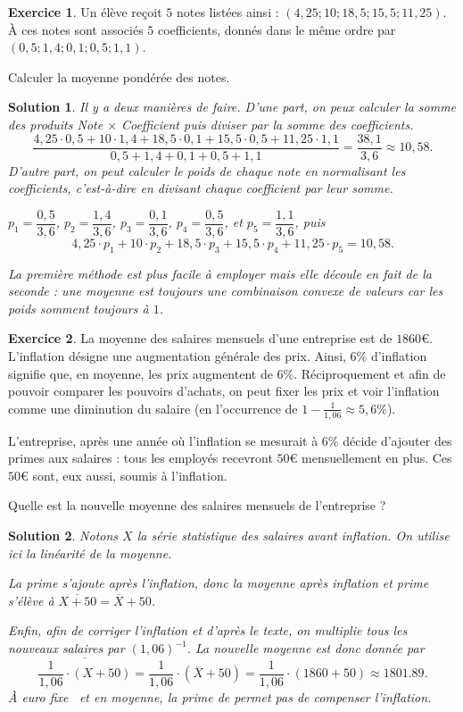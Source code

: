 \documentclass[a4paper, 14pt]{extarticle}
\theoremstyle{plain}
\newtheorem*{sol}{Solution}
\theoremstyle{definition}
\newtheorem{ex}{Exercice}
\newcommand{\exe}[2]{
		\begin{ex} #1  \end{ex}
		\begin{sol} #2 \end{sol}
	}
\newcommand{\exe}[2]{
		\begin{ex} #1  \end{ex}
	}
\begin{document}
\exe{
	Un élève reçoit $5$ notes listées ainsi : $(4,25 ; 10; 18,5 ; 15,5 ; 11,25)$.
	À ces notes sont associés $5$ coefficients, donnés dans le même ordre par $(0,5 ; 1,4 ; 0,1 ; 0,5; 1,1)$.
	
	Calculer la moyenne pondérée des notes.
}{
	Il y a deux manières de faire.
	D'une part, on peux calculer la somme des produits Note $\times$ Coefficient puis diviser par la somme des coefficients.
		\[ \dfrac{4,25\cdot0,5 + 10\cdot1,4 + 18,5\cdot0,1 + 15,5\cdot 0,5 + 11,25\cdot1,1}{0,5+1,4+0,1+0,5+1,1} = \dfrac{38,1}{3,6}  \approx 10,58. \]
	D'autre part, on peut calculer le poids de chaque note en normalisant les coefficients, c'est-à-dire en divisant chaque coefficient par leur somme.
	
	$p_1 = \dfrac{0,5}{3,6}$, $p_2 = \dfrac{1,4}{3,6}$, $p_3 = \dfrac{0,1}{3,6}$, $p_4 = \dfrac{0,5}{3,6}$, et $p_5 = \dfrac{1,1}{3,6}$, puis
		\[ 4,25 \cdot p_1 + 10\cdot p_2 + 18,5 \cdot p_3 + 15,5 \cdot p_4 + 11,25\cdot p_5 = 10,58. \]

	La première méthode est plus facile à employer mais elle découle en fait de la seconde : une moyenne est toujours une combinaison convexe de valeurs car les poids somment toujours à $1$.
}


\exe{
	La moyenne des salaires mensuels d'une entreprise est de $1860$€.
	L'inflation désigne une augmentation générale des prix. Ainsi, $6\%$ d'inflation signifie que, en moyenne, les prix augmentent de $6\%$.
	Réciproquement et afin de pouvoir comparer les pouvoirs d'achats, on peut fixer les prix et voir l'inflation comme une diminution du salaire (en l'occurrence de $1-\frac{1}{1,06} \approx 5,6 \%$).
	
	L'entreprise, après une année où l'inflation se mesurait à $6\%$ décide d'ajouter des primes aux salaires : tous les employés recevront $50$€ mensuellement en plus. Ces $50$€ sont, eux aussi, soumis à l'inflation.
	
	Quelle est la nouvelle moyenne des salaires mensuels de l'entreprise ?

}{
	Notons $X$ la série statistique des salaires avant inflation.
	On utilise ici la linéarité de la moyenne.
	
	La prime s'ajoute après l'inflation, donc la moyenne après inflation et prime s'élève à $\overline{X+50} = \overline{X} + 50$.
	
	Enfin, afin de corriger l'inflation et d'après le texte, on multiplie tous les nouveaux salaires par $(1,06)^{-1}$.
	La nouvelle moyenne est donc donnée par 
		\[ \overline{\frac{1}{1,06} \cdot \left( X + 50 \right) } = \frac{1}{1,06} \cdot \left( \overline{X} + 50 \right) = \frac{1}{1,06} \cdot (1860 + 50) \approx 1801.89. \]
	À \og euro fixe \fg \, et en moyenne, la prime de permet pas de compenser l'inflation.
}
\end{document}
